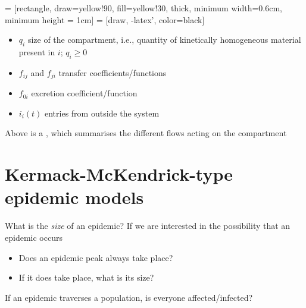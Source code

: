 \documentclass[aspectratio=169]{beamer}\usepackage[]{graphicx}\usepackage[]{xcolor}
\begin{document}
\begin{frame}{}
  \begin{minipage}{0.4\textwidth}
     = [rectangle, 
    draw=yellow!90, 
    fill=yellow!30, 
    thick, 
    minimum width=0.6cm,
    minimum height = 1cm]
     = [draw, 
    -latex', 
    color=black]
  \end{minipage}
  \begin{minipage}{0.55\textwidth}
    \begin{itemize}
      \item $q_i$ size of the compartment, i.e., quantity of kinetically homogeneous material present in $i$; $q_i\geq 0$ 
      \item $f_{ij}$ and $f_{ji}$ transfer coefficients/functions
      \item $f_{0i}$ excretion coefficient/function
      \item $i_i(t)$ entries from outside the system
    \end{itemize}
  \end{minipage}
  \vfill
  Above is a , which summarises the different flows acting on the compartment
\end{frame}


\section{Kermack-McKendrick-type epidemic models}



\begin{frame}{What is the \emph{size} of an epidemic?}
\bbullet 
If we are interested in the possibility that an epidemic occurs
\begin{itemize}
  \item Does an epidemic peak always take place?
  \item If it does take place, what is its size?
\end{itemize}
\vfill
\bbullet If an epidemic traverses a population, is everyone affected/infected?
\end{frame}
\end{document}
